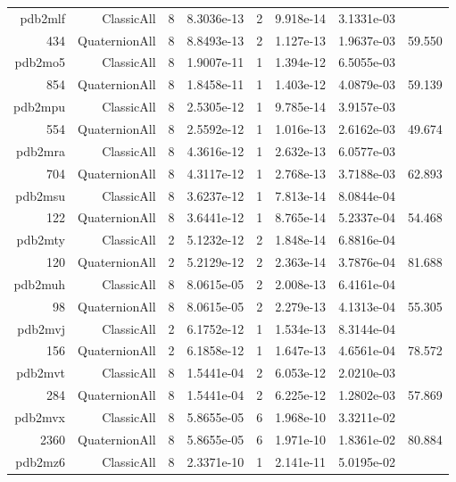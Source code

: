 \begin{xltabular}{\textwidth}{r|rcS[table-format=1.4e+2]cS[table-format=1.3e+2]S[table-format=1.4e+2]S[table-format=-1.3]}
pdb2mlf & ClassicAll & 8 & 8.3036e-13 & 2 & 9.918e-14 & 3.1331e-03 & \\
434 & QuaternionAll & 8 & 8.8493e-13 & 2 & 1.127e-13 & 1.9637e-03 & 59.550\\  \addlinespace
pdb2mo5 & ClassicAll & 8 & 1.9007e-11 & 1 & 1.394e-12 & 6.5055e-03 & \\
854 & QuaternionAll & 8 & 1.8458e-11 & 1 & 1.403e-12 & 4.0879e-03 & 59.139\\  \addlinespace
pdb2mpu & ClassicAll & 8 & 2.5305e-12 & 1 & 9.785e-14 & 3.9157e-03 & \\
554 & QuaternionAll & 8 & 2.5592e-12 & 1 & 1.016e-13 & 2.6162e-03 & 49.674\\  \addlinespace
pdb2mra & ClassicAll & 8 & 4.3616e-12 & 1 & 2.632e-13 & 6.0577e-03 & \\
704 & QuaternionAll & 8 & 4.3117e-12 & 1 & 2.768e-13 & 3.7188e-03 & 62.893\\  \addlinespace
pdb2msu & ClassicAll & 8 & 3.6237e-12 & 1 & 7.813e-14 & 8.0844e-04 & \\
122 & QuaternionAll & 8 & 3.6441e-12 & 1 & 8.765e-14 & 5.2337e-04 & 54.468\\  \addlinespace
pdb2mty & ClassicAll & 2 & 5.1232e-12 & 2 & 1.848e-14 & 6.8816e-04 & \\
120 & QuaternionAll & 2 & 5.2129e-12 & 2 & 2.363e-14 & 3.7876e-04 & 81.688\\  \addlinespace
pdb2muh & ClassicAll & 8 & 8.0615e-05 & 2 & 2.008e-13 & 6.4161e-04 & \\
98 & QuaternionAll & 8 & 8.0615e-05 & 2 & 2.279e-13 & 4.1313e-04 & 55.305\\  \addlinespace
pdb2mvj & ClassicAll & 2 & 6.1752e-12 & 1 & 1.534e-13 & 8.3144e-04 & \\
156 & QuaternionAll & 2 & 6.1858e-12 & 1 & 1.647e-13 & 4.6561e-04 & 78.572\\  \addlinespace
pdb2mvt & ClassicAll & 8 & 1.5441e-04 & 2 & 6.053e-12 & 2.0210e-03 & \\
284 & QuaternionAll & 8 & 1.5441e-04 & 2 & 6.225e-12 & 1.2802e-03 & 57.869\\  \addlinespace
pdb2mvx & ClassicAll & 8 & 5.8655e-05 & 6 & 1.968e-10 & 3.3211e-02 & \\
2360 & QuaternionAll & 8 & 5.8655e-05 & 6 & 1.971e-10 & 1.8361e-02 & 80.884\\  \addlinespace
pdb2mz6 & ClassicAll & 8 & 2.3371e-10 & 1 & 2.141e-11 & 5.0195e-02 & \\

\end{xltabular}
